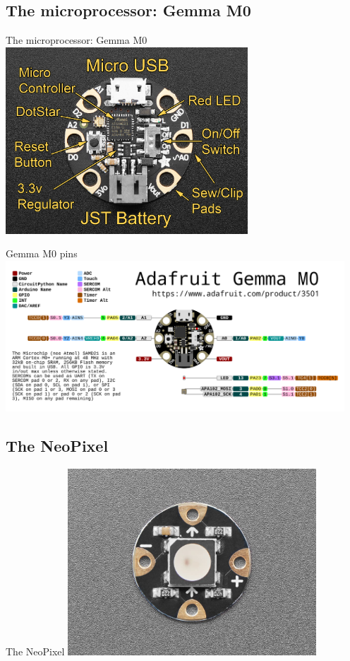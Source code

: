 \documentclass[aspectratio=169]{beamer}
\begin{document}
\subsection{The microprocessor: Gemma M0}
\begin{frame}[fragile]{The microprocessor: Gemma M0}
\includegraphics[height=2.75in]{gemma_guide.jpg}
\end{frame}
\begin{frame}[fragile]{Gemma M0 pins}
\includegraphics[width=5in]{adafruit_gemma_Adafruit_GEMMA_M0_pinout.png}
\end{frame}
\subsection{The NeoPixel}
\begin{frame}[fragile]{The NeoPixel}
\includegraphics[height=2.75in]{FloraNeoPixel.jpg}
\end{frame}
\end{document}
